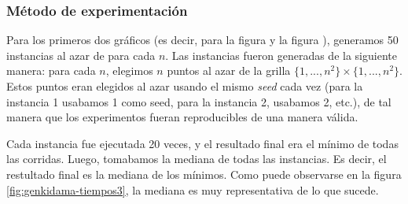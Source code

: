 \subsubsection{M\'etodo de experimentación}

Para los primeros dos gráficos (es decir, para la figura \label{fig:genkidama-tiempos1} y la figura \label{fig:genkidama-tiempos2}), generamos 50 instancias al azar de para cada $n$.
Las instancias fueron generadas de la siguiente manera: para cada $n$, elegimos $n$ puntos al azar de la grilla $\{1,..., n^2\} \times \{1, ... , n^2\}$.
Estos puntos eran elegidos al azar usando el mismo \emph{seed} cada vez (para la instancia 1 usabamos 1 como seed, para la instancia 2, usabamos 2, etc.), de tal manera que los experimentos fueran reproducibles de una manera válida.

Cada instancia fue ejecutada 20 veces, y el resultado final era el mínimo de todas las corridas.
Luego, tomabamos la mediana de todas las instancias.
Es decir, el restultado final es la mediana de los mínimos. Como puede observarse en la figura \ref{fig:genkidama-tiempos3}, la mediana es muy representativa de lo que sucede.
